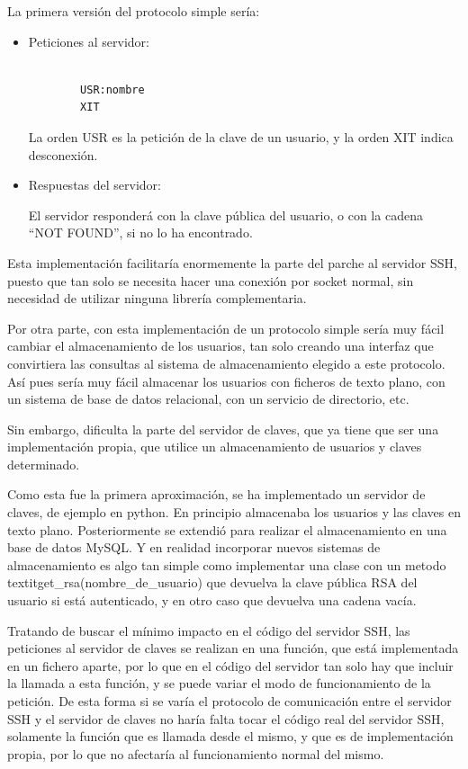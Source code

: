     La primera versión del protocolo simple sería:
    \begin{itemize}
    \item Peticiones al servidor:

        \begin{verbatim}

        USR:nombre
        XIT

        \end{verbatim}

        La orden USR es la petición de la clave de un usuario, y la orden
        XIT indica desconexión.

    \item Respuestas del servidor:

        El servidor responderá con la clave pública del usuario, o con la
        cadena ``NOT FOUND'', si no lo ha encontrado.

    \end{itemize}

    Esta implementación facilitaría enormemente la parte del parche al
    servidor SSH, puesto que tan solo se necesita hacer una conexión por
    socket normal, sin necesidad de utilizar ninguna librería
    complementaria.

    Por otra parte, con esta implementación de un protocolo simple sería
    muy fácil cambiar el almacenamiento de los usuarios, tan solo creando
    una interfaz que convirtiera las consultas al sistema de almacenamiento
    elegido a este protocolo. Así pues sería muy fácil almacenar los
    usuarios con ficheros de texto plano, con un sistema de base de datos
    relacional, con un servicio de directorio, etc.
    
    Sin embargo, dificulta la parte del servidor de claves, que ya tiene
    que ser una implementación propia, que utilice un almacenamiento de
    usuarios y claves determinado.

    Como esta fue la primera aproximación, se ha implementado un servidor
    de claves, de ejemplo en python. En principio almacenaba los usuarios y
    las claves en texto plano. Posteriormente se extendió para realizar el
    almacenamiento en una base de datos MySQL. Y en realidad incorporar
    nuevos sistemas de almacenamiento es algo tan simple como implementar
    una clase con un metodo textit{get\_rsa(nombre\_de\_usuario)} que devuelva
    la clave pública RSA del usuario si está autenticado, y en otro caso
    que devuelva una cadena vacía.

    Tratando de buscar el mínimo impacto en el código del servidor SSH, las
    peticiones al servidor de claves se realizan en una función, que está
    implementada en un fichero aparte, por lo que en el código del servidor
    tan solo hay que incluir la llamada a esta función, y se puede variar
    el modo de funcionamiento de la petición. De esta forma si se varía el
    protocolo de comunicación entre el servidor SSH y el servidor de claves
    no haría falta tocar el código real del servidor SSH, solamente la
    función que es llamada desde el mismo, y que es de implementación
    propia, por lo que no afectaría al funcionamiento normal del mismo.

